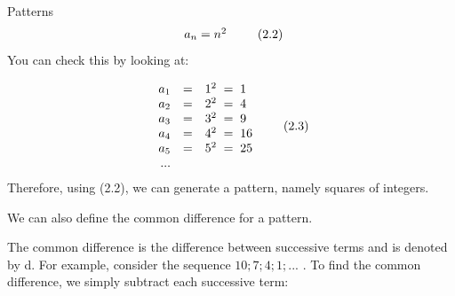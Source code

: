 \begin{exercises}{Patterns }
    \begin{equation}
    \begin{array}{cc}\hfill {a}_{n}={n}^{2}\end{array}\tag{2.2}
      \end{equation}
      \label{m39362*id64117}You can check this by looking at:\par 
      \label{m39362*id64122}\nopagebreak\noindent{}
        
    \begin{equation}
    \begin{array}{ccc}\hfill {a}_{1}& =& {1}^{2}\phantom{\rule{0.277778em}{0ex}}=\phantom{\rule{0.277778em}{0ex}}1\hfill \\ \hfill {a}_{2}& =& {2}^{2}\phantom{\rule{0.277778em}{0ex}}=\phantom{\rule{0.277778em}{0ex}}4\hfill \\ \hfill {a}_{3}& =& {3}^{2}\phantom{\rule{0.277778em}{0ex}}=\phantom{\rule{0.277778em}{0ex}}9\hfill \\ \hfill {a}_{4}& =& {4}^{2}\phantom{\rule{0.277778em}{0ex}}=\phantom{\rule{0.277778em}{0ex}}16\hfill \\ \hfill {a}_{5}& =& {5}^{2}\phantom{\rule{0.277778em}{0ex}}=\phantom{\rule{0.277778em}{0ex}}25\hfill \\ \hfill ...\end{array}\tag{2.3}
      \end{equation}
      \label{m39362*id64323}Therefore, using (2.2), we can generate a pattern, namely squares of integers.\par 
\label{m39362*eip-695}We can also define the common difference for a pattern. \vspace{\rubberspace}\par
 {The common difference is the difference between successive terms and is denoted by d. } 
For example, consider the sequence $10;7;4;1;\mathrm{...}$ . To find the common difference, we simply subtract each successive term:
\label{m39362*id872}\nopagebreak\noindent{}


\end{exercises}
